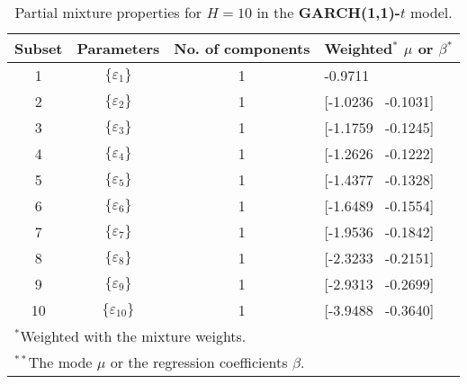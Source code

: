 \footnotesize{  
{ \renewcommand{\arraystretch}{1.3} 
\begin{longtable}{cccp{3.6cm}} 
\caption{Partial mixture properties for $H=10$ in the \textbf{GARCH(1,1)-$t$} model.} 
\label{tab:pmits_t_garch2_noS_ML} \\ 
 Subset & Parameters & No. of components  & Weighted$^{*}$ $\mu$ or $\beta$$^{*}$ \\ \hline 
1 & $\{\varepsilon_{1}\}$ & 1 & -0.9711   \\ [1ex] 
2 & $\{\varepsilon_{2}\}$ & 1 & [-1.0236 \, -0.1031]   \\ [1ex] 
3 & $\{\varepsilon_{3}\}$ & 1 & [-1.1759 \, -0.1245]   \\ [1ex] 
4 & $\{\varepsilon_{4}\}$ & 1 & [-1.2626 \, -0.1222]   \\ [1ex] 
5 & $\{\varepsilon_{5}\}$ & 1 & [-1.4377 \, -0.1328]   \\ [1ex] 
6 & $\{\varepsilon_{6}\}$ & 1 & [-1.6489 \, -0.1554]   \\ [1ex] 
7 & $\{\varepsilon_{7}\}$ & 1 & [-1.9536 \, -0.1842]   \\ [1ex] 
8 & $\{\varepsilon_{8}\}$ & 1 & [-2.3233 \, -0.2151]   \\ [1ex] 
9 & $\{\varepsilon_{9}\}$ & 1 & [-2.9313 \, -0.2699]   \\ [1ex] 
10 & $\{\varepsilon_{10}\}$ & 1 & [-3.9488 \, -0.3640]   \\ [1ex] 
\hline 
 \multicolumn{4}{l}{\footnotesize{$^{*}$Weighted with the mixture weights.}} \\ 
 \multicolumn{4}{l}{\footnotesize{$^{**}$The mode $\mu$ or the regression coefficients $\beta$.}} \\ 
\end{longtable} 
} 
} 
\normalsize 
